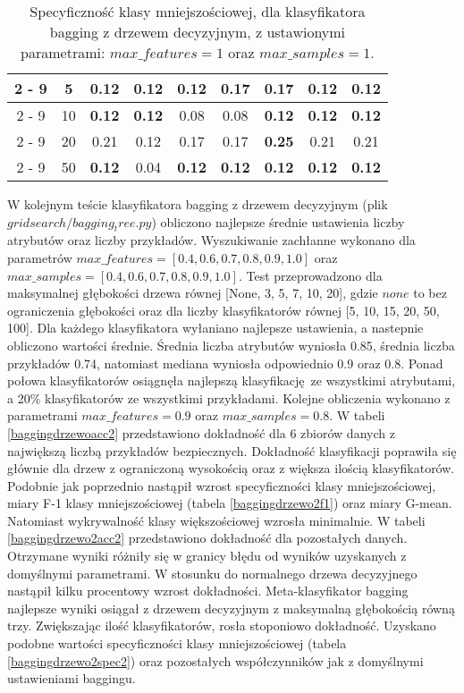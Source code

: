 \begin{table}[H]
\begin{center}
{\begin{tabular}{c|c|ccccccc}
				\cline{2%
					-%
					9}%
				&5&0.12&0.12&0.12&\textbf{0.17}&\textbf{0.17}&0.12&0.12\\%
				\cline{2%
					-%
					9}%
				&10&\textbf{0.12}&\textbf{0.12}&0.08&0.08&\textbf{0.12}&\textbf{0.12}&\textbf{0.12}\\%
				\cline{2%
					-%
					9}%
				&20&0.21&0.12&0.17&0.17&\textbf{0.25}&0.21&0.21\\%
				\cline{2%
					-%
					9}%
				&50&\textbf{0.12}&0.04&\textbf{0.12}&\textbf{0.12}&\textbf{0.12}&\textbf{0.12}&\textbf{0.12}\\%
				\hline%
			\end{tabular}}
			\caption{Specyficzność klasy mniejszościowej, dla klasyfikatora bagging z drzewem decyzyjnym, z ustawionymi parametrami: $max\_features = 1$ oraz $max\_samples = 1$.}
			\label{baggingdrzewospec}
		\end{center}
	\end{table}
\par
W kolejnym teście klasyfikatora bagging z drzewem decyzyjnym (plik $gridsearch/bagging_tree.py$) obliczono najlepsze średnie ustawienia liczby atrybutów oraz liczby przykładów. Wyszukiwanie zachłanne wykonano dla parametrów $max\_features=[0.4, 0.6, 0.7, 0.8, 0.9, 1.0]$ oraz $max\_samples=[0.4, 0.6, 0.7, 0.8, 0.9, 1.0]$. Test przeprowadzono dla maksymalnej głębokości drzewa równej [None, 3, 5, 7, 10, 20], gdzie $none$ to bez ograniczenia głębokości oraz dla liczby klasyfikatorów równej [5, 10, 15, 20, 50, 100]. Dla każdego klasyfikatora wyłaniano najlepsze ustawienia, a nastepnie obliczono wartości średnie. Średnia liczba atrybutów wyniosła 0.85, średnia liczba przykładów 0.74, natomiast mediana wyniosła odpowiednio 0.9 oraz 0.8. Ponad połowa klasyfikatorów osiągnęła najlepszą klasyfikację ze wszystkimi atrybutami, a 20\% klasyfikatorów ze wszystkimi przykładami. Kolejne obliczenia wykonano z parametrami $max\_features = 0.9$ oraz $max\_samples = 0.8$. W tabeli \ref{baggingdrzewoacc2} przedstawiono dokładność dla 6 zbiorów danych z największą liczbą przykładów bezpiecznych. Dokładność klasyfikacji poprawiła się głównie dla drzew z ograniczoną wysokością oraz z większa ilością klasyfikatorów. Podobnie jak poprzednio nastąpił wzrost specyficzności klasy mniejszościowej, miary F-1 klasy mniejszościowej (tabela \ref{baggingdrzewo2f1}) oraz miary G-mean. Natomiast wykrywalność klasy większościowej wzrosła minimalnie. W tabeli \ref{baggingdrzewo2acc2} przedstawiono dokładność dla pozostałych danych. Otrzymane wyniki różniły się w granicy błędu od wyników uzyskanych z domyślnymi parametrami. W stosunku do normalnego drzewa decyzyjnego nastąpił kilku procentowy wzrost dokładności. Meta-klasyfikator bagging najlepsze wyniki osiągał z drzewem decyzyjnym z maksymalną głębokością równą trzy. Zwiększając ilość klasyfikatorów, rosła stoponiowo dokładność. Uzyskano podobne wartości specyficzności klasy mniejszościowej (tabela \ref{baggingdrzewo2spec2}) oraz pozostałych współczynników jak z domyślnymi ustawieniami baggingu.
